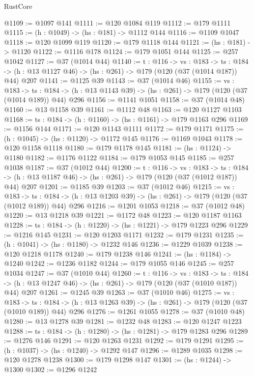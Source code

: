 \begin{lexlean}{RustCore}
\begin{coremodule}
@1109 := @1097 @141
@1111 := @120 @1084 @119
@1112 := @179 @1111
@1115 := (h : @1049) -> (hs : @181) -> @1112 @144
@1116 := @1109 @1047
@1118 := @120 @1099 @119
@1120 := @179 @1118 @144
@1121 := (hs : @181) -> @1120
@1122 := @1116 @178
@1124 := @179 @1051 @144
@1125 := @257 @1042
@1127 := @37 (@1014 @44)
@1140 := {t : @116} ->
  {vs : @183} ->
  {ts : @184} -> (h : @13 @1127 @46) -> (hs : @261) -> @179 (@120 (@37 (@1014 @187)) @44) @207
@1141 := @1125 @39
@1143 := @37 (@1014 @46)
@1155 := {vs : @183} ->
  {ts : @184} -> (h : @13 @1143 @39) -> (hs : @261) -> @179 (@120 (@37 (@1014 @189)) @44) @296
@1156 := @1141 @1051
@1158 := @37 (@1014 @48)
@1160 := @13 @1158 @39
@1161 := @1112 @48
@1163 := @120 @1127 @1103
@1168 := {ts : @184} -> (h : @1160) -> (hs : @1161) -> @179 @1163 @296
@1169 := @1156 @144
@1171 := @120 @1143 @1111
@1172 := @179 @1171
@1175 := (h : @1045) -> (hs : @1120) -> @1172 @145
@1176 := @1169 @1043
@1178 := @120 @1158 @1118
@1180 := @179 @1178 @145
@1181 := (hs : @1124) -> @1180
@1182 := @1176 @1122
@1184 := @179 @1053 @145
@1185 := @257 @1038
@1187 := @37 (@1012 @44)
@1200 := {t : @116} ->
  {vs : @183} ->
  {ts : @184} -> (h : @13 @1187 @46) -> (hs : @261) -> @179 (@120 (@37 (@1012 @187)) @44) @207
@1201 := @1185 @39
@1203 := @37 (@1012 @46)
@1215 := {vs : @183} ->
  {ts : @184} -> (h : @13 @1203 @39) -> (hs : @261) -> @179 (@120 (@37 (@1012 @189)) @44) @296
@1216 := @1201 @1053
@1218 := @37 (@1012 @48)
@1220 := @13 @1218 @39
@1221 := @1172 @48
@1223 := @120 @1187 @1163
@1228 := {ts : @184} -> (h : @1220) -> (hs : @1221) -> @179 @1223 @296
@1229 := @1216 @145
@1231 := @120 @1203 @1171
@1232 := @179 @1231
@1235 := (h : @1041) -> (hs : @1180) -> @1232 @146
@1236 := @1229 @1039
@1238 := @120 @1218 @1178
@1240 := @179 @1238 @146
@1241 := (hs : @1184) -> @1240
@1242 := @1236 @1182
@1244 := @179 @1055 @146
@1245 := @257 @1034
@1247 := @37 (@1010 @44)
@1260 := {t : @116} ->
  {vs : @183} ->
  {ts : @184} -> (h : @13 @1247 @46) -> (hs : @261) -> @179 (@120 (@37 (@1010 @187)) @44) @207
@1261 := @1245 @39
@1263 := @37 (@1010 @46)
@1275 := {vs : @183} ->
  {ts : @184} -> (h : @13 @1263 @39) -> (hs : @261) -> @179 (@120 (@37 (@1010 @189)) @44) @296
@1276 := @1261 @1055
@1278 := @37 (@1010 @48)
@1280 := @13 @1278 @39
@1281 := @1232 @48
@1283 := @120 @1247 @1223
@1288 := {ts : @184} -> (h : @1280) -> (hs : @1281) -> @179 @1283 @296
@1289 := @1276 @146
@1291 := @120 @1263 @1231
@1292 := @179 @1291
@1295 := (h : @1037) -> (hs : @1240) -> @1292 @147
@1296 := @1289 @1035
@1298 := @120 @1278 @1238
@1300 := @179 @1298 @147
@1301 := (hs : @1244) -> @1300
@1302 := @1296 @1242

\end{coremodule}
\end{lexlean}
